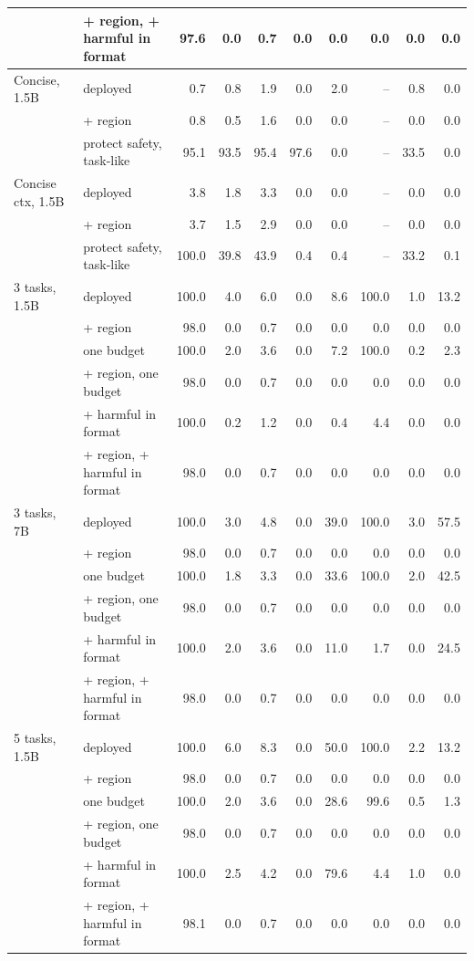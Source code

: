 \begin{table}[t]
{\begin{tabular}{l l r rr r r r r r}
 & + region, + harmful in format & 97.6 & 0.0 & 0.7 & 0.0 & 0.0 & 0.0 & 0.0 & 0.0 \\
\midrule
Concise, 1.5B & deployed & 0.7 & 0.8 & 1.9 & 0.0 & 2.0 & -- & 0.8 & 0.0 \\
 & + region & 0.8 & 0.5 & 1.6 & 0.0 & 0.0 & -- & 0.0 & 0.0 \\
 & protect safety, task-like & 95.1 & 93.5 & 95.4 & 97.6 & 0.0 & -- & 33.5 & 0.0 \\
\midrule
Concise ctx, 1.5B & deployed & 3.8 & 1.8 & 3.3 & 0.0 & 0.0 & -- & 0.0 & 0.0 \\
 & + region & 3.7 & 1.5 & 2.9 & 0.0 & 0.0 & -- & 0.0 & 0.0 \\
 & protect safety, task-like & 100.0 & 39.8 & 43.9 & 0.4 & 0.4 & -- & 33.2 & 0.1 \\
\midrule
3 tasks, 1.5B & deployed & 100.0 & 4.0 & 6.0 & 0.0 & 8.6 & 100.0 & 1.0 & 13.2 \\
 & + region & 98.0 & 0.0 & 0.7 & 0.0 & 0.0 & 0.0 & 0.0 & 0.0 \\
 & one budget & 100.0 & 2.0 & 3.6 & 0.0 & 7.2 & 100.0 & 0.2 & 2.3 \\
 & + region, one budget & 98.0 & 0.0 & 0.7 & 0.0 & 0.0 & 0.0 & 0.0 & 0.0 \\
 & + harmful in format & 100.0 & 0.2 & 1.2 & 0.0 & 0.4 & 4.4 & 0.0 & 0.0 \\
 & + region, + harmful in format & 98.0 & 0.0 & 0.7 & 0.0 & 0.0 & 0.0 & 0.0 & 0.0 \\
\midrule
3 tasks, 7B & deployed & 100.0 & 3.0 & 4.8 & 0.0 & 39.0 & 100.0 & 3.0 & 57.5 \\
 & + region & 98.0 & 0.0 & 0.7 & 0.0 & 0.0 & 0.0 & 0.0 & 0.0 \\
 & one budget & 100.0 & 1.8 & 3.3 & 0.0 & 33.6 & 100.0 & 2.0 & 42.5 \\
 & + region, one budget & 98.0 & 0.0 & 0.7 & 0.0 & 0.0 & 0.0 & 0.0 & 0.0 \\
 & + harmful in format & 100.0 & 2.0 & 3.6 & 0.0 & 11.0 & 1.7 & 0.0 & 24.5 \\
 & + region, + harmful in format & 98.0 & 0.0 & 0.7 & 0.0 & 0.0 & 0.0 & 0.0 & 0.0 \\
\midrule
5 tasks, 1.5B & deployed & 100.0 & 6.0 & 8.3 & 0.0 & 50.0 & 100.0 & 2.2 & 13.2 \\
 & + region & 98.0 & 0.0 & 0.7 & 0.0 & 0.0 & 0.0 & 0.0 & 0.0 \\
 & one budget & 100.0 & 2.0 & 3.6 & 0.0 & 28.6 & 99.6 & 0.5 & 1.3 \\
 & + region, one budget & 98.0 & 0.0 & 0.7 & 0.0 & 0.0 & 0.0 & 0.0 & 0.0 \\
 & + harmful in format & 100.0 & 2.5 & 4.2 & 0.0 & 79.6 & 4.4 & 1.0 & 0.0 \\
 & + region, + harmful in format & 98.1 & 0.0 & 0.7 & 0.0 & 0.0 & 0.0 & 0.0 & 0.0 \\
\bottomrule
\end{tabular}}
\end{table}
